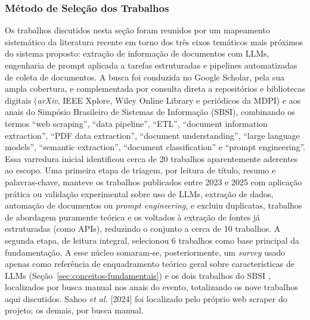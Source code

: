 \documentclass[12pt]{article}
\begin{document}
  \subsubsection{Método de Seleção dos Trabalhos}
  Os trabalhos discutidos nesta seção foram reunidos por um mapeamento sistemático da literatura recente em torno dos três eixos temáticos mais próximos do sistema proposto: extração de informação de documentos com LLMs, engenharia de prompt aplicada a tarefas estruturadas e pipelines automatizadas de coleta de documentos. A busca foi conduzida no Google Scholar, pela sua ampla cobertura, e complementada por consulta direta a repositórios e bibliotecas digitais (\emph{arXiv}, IEEE Xplore, Wiley Online Library e periódicos da MDPI) e aos anais do Simpósio Brasileiro de Sistemas de Informação (SBSI), combinando os termos ``web scraping'', ``data pipeline'', ``ETL'', ``document information extraction'', ``PDF data extraction'', ``document understanding'', ``large language models'', ``semantic extraction'', ``document classification'' e ``prompt engineering''. Essa varredura inicial identificou cerca de 20 trabalhos aparentemente aderentes ao escopo. Uma primeira etapa de triagem, por leitura de título, resumo e palavras-chave, manteve os trabalhos publicados entre 2023 e 2025 com aplicação prática ou validação experimental sobre uso de LLMs, extração de dados, automação de documentos ou \emph{prompt engineering}, e excluiu duplicatas, trabalhos de abordagem puramente teórica e os voltados à extração de fontes já estruturadas (como APIs), reduzindo o conjunto a cerca de 10 trabalhos. A segunda etapa, de leitura integral, selecionou 6 trabalhos \cite{b1,b2,b3,b4,b5,b6} como base principal da fundamentação. A esse núcleo somaram-se, posteriormente, um \emph{survey} \cite{b7} usado apenas como referência de enquadramento teórico geral sobre características de LLMs (Seção~\ref{sec:conceitos-fundamentais}) e os dois trabalhos do SBSI \cite{b8,b9}, localizados por busca manual nos anais do evento, totalizando os nove trabalhos aqui discutidos. Sahoo \emph{et al.} [2024] foi localizado pelo próprio web scraper do projeto; os demais, por busca manual.
\end{document}
